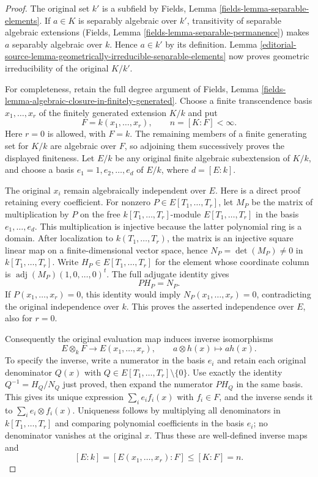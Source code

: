 \begin{proof}
The original set $k'$ is a subfield
by Fields, Lemma \ref{fields-lemma-separable-elements}.
If $a\in K$ is separably algebraic
over $k'$, transitivity of separable
algebraic extensions (Fields, Lemma
\ref{fields-lemma-separable-permanence})
makes $a$ separably algebraic over
$k$. Hence $a\in k'$ by its
definition. Lemma
\ref{editorial-source-lemma-geometrically-irreducible-separable-elements}
now proves geometric irreducibility
of the original $K/k'$.

For completeness, retain the full
degree argument of Fields, Lemma
\ref{fields-lemma-algebraic-closure-in-finitely-generated}.
Choose a finite transcendence basis
$x_1,\ldots,x_r$ of the finitely
generated extension $K/k$ and put
$$
F=k(x_1,\ldots,x_r),\qquad n=[K:F]<\infty.
$$
Here $r=0$ is allowed, with $F=k$.
The remaining members of a finite
generating set for $K/k$ are
algebraic over $F$, so adjoining
them successively proves the
displayed finiteness. Let $E/k$
be any original finite algebraic
subextension of $K/k$, and choose
a basis $e_1=1,e_2,\ldots,e_d$ of
$E/k$, where $d=[E:k]$.

The original $x_i$ remain
algebraically independent over $E$.
Here is a direct proof retaining
every coefficient. For nonzero
$P\in E[T_1,\ldots,T_r]$, let $M_P$
be the matrix of multiplication
by $P$ on the free $k[T_1,\ldots,T_r]$-module
$E[T_1,\ldots,T_r]$ in the basis
$e_1,\ldots,e_d$. This multiplication
is injective because the latter
polynomial ring is a domain.
After localization to $k(T_1,\ldots,T_r)$,
the matrix is an injective square
linear map on a finite-dimensional
vector space, hence
$N_P=\det(M_P)\neq0$ in $k[T_1,\ldots,T_r]$.
Write $H_P\in E[T_1,\ldots,T_r]$
for the element whose coordinate
column is $\operatorname{adj}(M_P)(1,0,\ldots,0)^t$.
The full adjugate identity gives
$$
P H_P=N_P.
$$
If $P(x_1,\ldots,x_r)=0$, this
identity would imply
$N_P(x_1,\ldots,x_r)=0$, contradicting
the original independence over $k$.
This proves the asserted independence
over $E$, also for $r=0$.

Consequently the original evaluation
map induces inverse isomorphisms
$$
E\otimes_k F\longrightarrow E(x_1,\ldots,x_r),
\qquad a\otimes h(x)\longmapsto a h(x).
$$
To specify the inverse, write a
numerator in the basis $e_i$ and
retain each original denominator
$Q(x)$ with $Q\in E[T_1,\ldots,T_r]\setminus\{0\}$.
Use exactly the identity
$Q^{-1}=H_Q/N_Q$ just proved,
then expand the numerator $P H_Q$
in the same basis. This gives
its unique expression
$\sum_i e_i f_i(x)$ with $f_i\in F$,
and the inverse sends it to
$\sum_i e_i\otimes f_i(x)$.
Uniqueness follows by multiplying
all denominators in $k[T_1,\ldots,T_r]$
and comparing polynomial coefficients
in the basis $e_i$; no denominator
vanishes at the original $x$.
Thus these are well-defined inverse
maps and
$$
[E:k]=[E(x_1,\ldots,x_r):F]\leq[K:F]=n.
$$


\end{proof}

